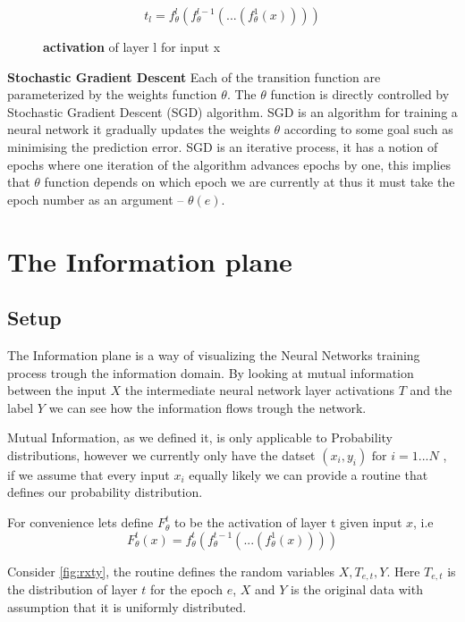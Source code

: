 \begin{figure}[H]
  \[ t_l = f_{\theta}^l(f_{\theta}^{l-1}(...(f_{\theta}^1(x)))) \]
  \caption{\textbf{activation} of layer l for input x}
  \label{eq:layerL}
\end{figure}

\textbf{Stochastic Gradient Descent} Each of the transition function are
parameterized by the weights function $\theta$. The $\theta$ function is
directly controlled by Stochastic Gradient Descent (SGD) algorithm.  SGD is an
algorithm for training a neural network it gradually updates the weights
$\theta$ according to some goal such as minimising the prediction error.  SGD is
an iterative process, it has a notion of epochs where one iteration of the
algorithm advances epochs by one, this implies that $\theta$ function depends on
which epoch we are currently at thus it must take the epoch number as an
argument -- $\theta(e)$.

\section{The Information plane}

\subsection{Setup}

The Information plane is a way of visualizing the Neural Networks training
process trough the information domain. By looking at mutual information between
the input $X$ the intermediate neural network layer activations $T$ and the
label $Y$ we can see how the information flows trough the network.

Mutual Information, as we defined it, is only applicable to Probability
distributions, however we currently only have the datset 
$(x_i, y_i) \text{ for } i = 1...N$
, if we assume that every input $x_i$ equally likely we can provide a routine
that defines our probability distribution.

For convenience lets define $F_{\theta}^t$ to be the activation of layer t given
input $x$, i.e
\begin{equation}
  F_{\theta}^t(x) = f_{\theta}^t(f_{\theta}^{t-1}(...(f_{\theta}^1(x))))
  \label{eq:bigF}
\end{equation}


Consider \autoref{fig:rxty}, the routine defines the random variables
$X,T_{e,t},Y$. Here $T_{e,t}$ is the distribution of layer $t$ for the epoch $e$,
$X$ and $Y$ is the original data with assumption that it is uniformly
distributed. 

